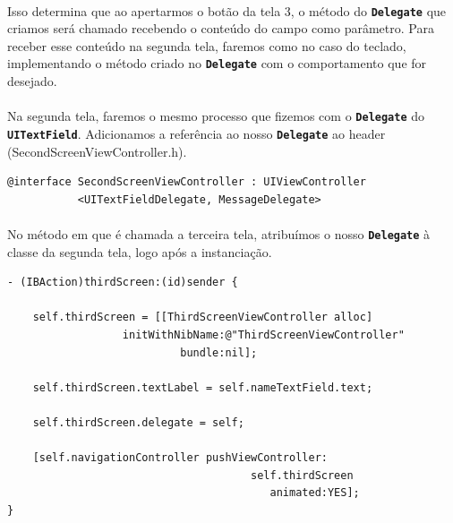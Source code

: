 \documentclass[a4paper,12pt,brazil,doubleside]{book}
\begin{document}
\paragraph{}Isso determina que ao apertarmos o botão da tela 3, o método do \texttt{\textbf{Delegate}} que criamos será chamado recebendo o conteúdo do campo como parâmetro. Para receber esse conteúdo na segunda tela, faremos como no caso do teclado, implementando o método criado no \texttt{\textbf{Delegate}} com o comportamento que for desejado.

\paragraph{}Na segunda tela, faremos o mesmo processo que fizemos com o \texttt{\textbf{Delegate}} do \texttt{\textbf{UITextField}}. Adicionamos a referência ao nosso \texttt{\textbf{Delegate}} ao header (SecondScreenViewController.h).\\

\begin{listing}
\begin{verbatim}
@interface SecondScreenViewController : UIViewController
           <UITextFieldDelegate, MessageDelegate>
\end{verbatim}
\end{listing}

\paragraph{}No método em que é chamada a terceira tela, atribuímos o nosso \texttt{\textbf{Delegate}} à classe da segunda tela, logo após a instanciação.

\pagebreak

\begin{listing}
\begin{verbatim}
- (IBAction)thirdScreen:(id)sender {
    
    self.thirdScreen = [[ThirdScreenViewController alloc]
                  initWithNibName:@"ThirdScreenViewController"
                           bundle:nil];
    
    self.thirdScreen.textLabel = self.nameTextField.text;
    
    self.thirdScreen.delegate = self;
    
    [self.navigationController pushViewController:
                                      self.thirdScreen
                                         animated:YES];
}
\end{verbatim}
\end{listing}
\end{document}
